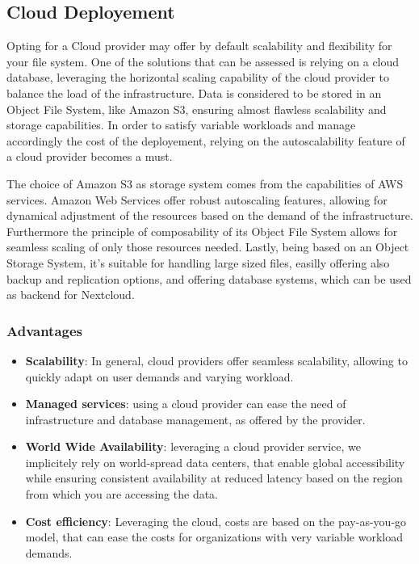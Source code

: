 \documentclass{article}
\begin{document}
	\subsection{Cloud Deployement}
	Opting for a Cloud provider may offer by default scalability and flexibility for your file system. One of the solutions that can be assessed is relying on a cloud database, leveraging the horizontal scaling capability of the cloud provider to balance the load of the infrastructure.
	Data is considered to be stored in an Object File System, like Amazon S3, ensuring almost flawless scalability and storage capabilities. In order to satisfy variable workloads and manage accordingly the cost of the deployement, relying on the autoscalability feature of a cloud provider becomes a must.
	
	The choice of Amazon S3 as storage system comes from the capabilities of AWS services. Amazon Web Services offer robust autoscaling features, allowing for dynamical adjustment of the resources based on the demand of the infrastructure. Furthermore the principle of composability of its Object File System allows for seamless scaling of only those resources needed. Lastly, being based on an Object Storage System, it's suitable for handling large sized files, easilly offering also backup and replication options, and offering database systems, which can be used as backend for Nextcloud.
	
	\subsubsection{Advantages}
	\begin{itemize}
		\item \textbf{Scalability}: In general, cloud providers offer seamless scalability, allowing to quickly adapt on user demands and varying workload.
		\item \textbf{Managed services}: using a cloud provider can ease the need of infrastructure and database management, as offered by the provider.
		\item \textbf{World Wide Availability}: leveraging a cloud provider service, we implicitely rely on world-spread data centers, that enable global accessibility while ensuring consistent availability at reduced latency based on the region from which you are accessing the data.
		\item \textbf{Cost efficiency}: Leveraging the cloud, costs are based on the pay-as-you-go model, that can ease the costs for organizations with very variable workload demands.
	\end{itemize}
	
\end{document}
